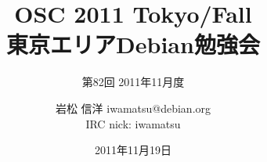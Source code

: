 




\documentclass[cjk,dvipdfmx,12pt]{beamer}
\usepackage{monthlypresentation}



\title{OSC 2011 Tokyo/Fall \\東京エリアDebian勉強会}
\subtitle{第82回 2011年11月度}
\author{岩松 信洋 iwamatsu@debian.org\\IRC nick: iwamatsu}
\date{2011年11月19日}



